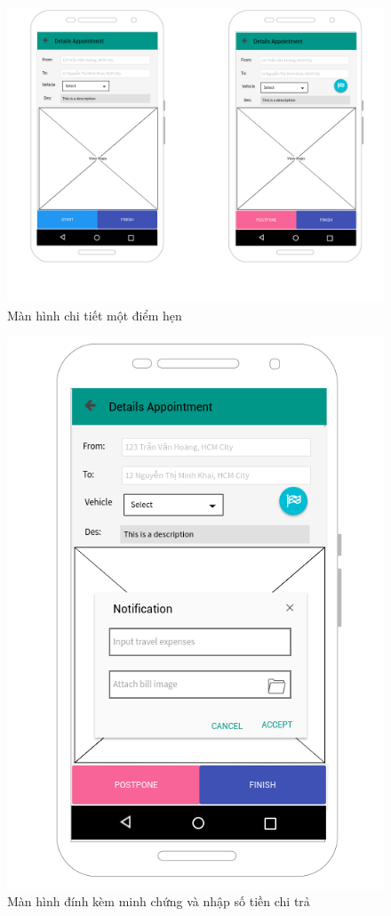 \documentclass[a4paper]{article}
\begin{document}
\begin{figure}[h]
    \includegraphics[width=12cm]{Mockup/AP_detailsappointment}
    \centering
    \caption{Màn hình chi tiết một điểm hẹn}
    \label{fig:AP_detailsappointment}
\end{figure}
\begin{figure}[h]
    \includegraphics[scale=0.6]{Mockup/AP_finishappointment}
    \centering
    \caption{Màn hình đính kèm minh chứng và nhập số tiền chi trả}
    \label{fig:AP_finishappointment}
\end{figure}
\end{document}
